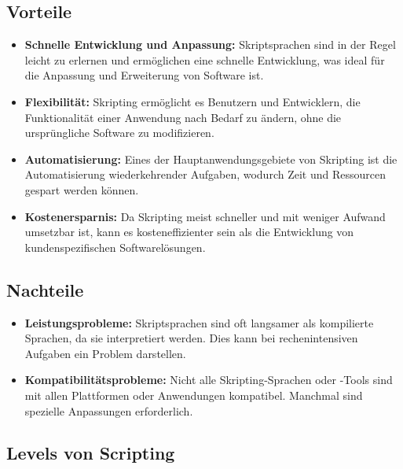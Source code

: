 \newpage

\subsection*{Vorteile}

\begin{itemize}
    \item \textbf{Schnelle Entwicklung und Anpassung:} Skriptsprachen sind in der Regel 
    leicht zu erlernen und ermöglichen eine schnelle Entwicklung, was ideal für die 
    Anpassung und Erweiterung von Software ist.
    \item \textbf{Flexibilität:} Skripting ermöglicht es Benutzern und Entwicklern, 
    die Funktionalität einer Anwendung nach Bedarf zu ändern, ohne die ursprüngliche 
    Software zu modifizieren.
    \item \textbf{Automatisierung:} Eines der Hauptanwendungsgebiete von Skripting ist 
    die Automatisierung wiederkehrender Aufgaben, wodurch Zeit und Ressourcen 
    gespart werden können.
    \item \textbf{Kostenersparnis:} Da Skripting meist schneller und mit weniger 
    Aufwand umsetzbar ist, kann es kosteneffizienter sein als die Entwicklung von 
    kundenspezifischen Softwarelösungen.

\end{itemize}

\subsection*{Nachteile}

\begin{itemize}
    \item \textbf{Leistungsprobleme:} Skriptsprachen sind oft langsamer als kompilierte Sprachen, 
    da sie interpretiert werden. Dies kann bei rechenintensiven Aufgaben ein Problem darstellen.
    \item \textbf{Kompatibilitätsprobleme:} Nicht alle Skripting-Sprachen oder -Tools sind 
    mit allen Plattformen oder Anwendungen kompatibel. Manchmal sind spezielle 
    Anpassungen erforderlich.
\end{itemize}

\newpage

\subsection*{Levels von Scripting}

